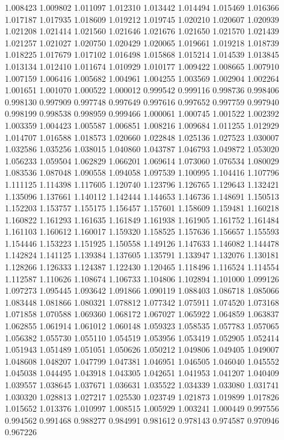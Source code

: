 1.008423
1.009802
1.011097
1.012310
1.013442
1.014494
1.015469
1.016366
1.017187
1.017935
1.018609
1.019212
1.019745
1.020210
1.020607
1.020939
1.021208
1.021414
1.021560
1.021646
1.021676
1.021650
1.021570
1.021439
1.021257
1.021027
1.020750
1.020429
1.020065
1.019661
1.019218
1.018739
1.018225
1.017679
1.017102
1.016498
1.015868
1.015214
1.014539
1.013845
1.013134
1.012410
1.011674
1.010929
1.010177
1.009422
1.008665
1.007910
1.007159
1.006416
1.005682
1.004961
1.004255
1.003569
1.002904
1.002264
1.001651
1.001070
1.000522
1.000012
0.999542
0.999116
0.998736
0.998406
0.998130
0.997909
0.997748
0.997649
0.997616
0.997652
0.997759
0.997940
0.998199
0.998538
0.998959
0.999466
1.000061
1.000745
1.001522
1.002392
1.003359
1.004423
1.005587
1.006851
1.008216
1.009684
1.011255
1.012929
1.014707
1.016588
1.018573
1.020660
1.022848
1.025136
1.027523
1.030007
1.032586
1.035256
1.038015
1.040860
1.043787
1.046793
1.049872
1.053020
1.056233
1.059504
1.062829
1.066201
1.069614
1.073060
1.076534
1.080029
1.083536
1.087048
1.090558
1.094058
1.097539
1.100995
1.104416
1.107796
1.111125
1.114398
1.117605
1.120740
1.123796
1.126765
1.129643
1.132421
1.135096
1.137661
1.140112
1.142444
1.144653
1.146736
1.148691
1.150513
1.152203
1.153757
1.155175
1.156457
1.157601
1.158609
1.159481
1.160218
1.160822
1.161293
1.161635
1.161849
1.161938
1.161905
1.161752
1.161484
1.161103
1.160612
1.160017
1.159320
1.158525
1.157636
1.156657
1.155593
1.154446
1.153223
1.151925
1.150558
1.149126
1.147633
1.146082
1.144478
1.142824
1.141125
1.139384
1.137605
1.135791
1.133947
1.132076
1.130181
1.128266
1.126333
1.124387
1.122430
1.120465
1.118496
1.116524
1.114554
1.112587
1.110626
1.108674
1.106733
1.104806
1.102894
1.101000
1.099126
1.097273
1.095445
1.093642
1.091866
1.090119
1.088403
1.086718
1.085066
1.083448
1.081866
1.080321
1.078812
1.077342
1.075911
1.074520
1.073168
1.071858
1.070588
1.069360
1.068172
1.067027
1.065922
1.064859
1.063837
1.062855
1.061914
1.061012
1.060148
1.059323
1.058535
1.057783
1.057065
1.056382
1.055730
1.055110
1.054519
1.053956
1.053419
1.052905
1.052414
1.051943
1.051489
1.051051
1.050626
1.050212
1.049806
1.049405
1.049007
1.048608
1.048207
1.047799
1.047381
1.046951
1.046505
1.046040
1.045552
1.045038
1.044495
1.043918
1.043305
1.042651
1.041953
1.041207
1.040409
1.039557
1.038645
1.037671
1.036631
1.035522
1.034339
1.033080
1.031741
1.030320
1.028813
1.027217
1.025530
1.023749
1.021873
1.019899
1.017826
1.015652
1.013376
1.010997
1.008515
1.005929
1.003241
1.000449
0.997556
0.994562
0.991468
0.988277
0.984991
0.981612
0.978143
0.974587
0.970946
0.967226
